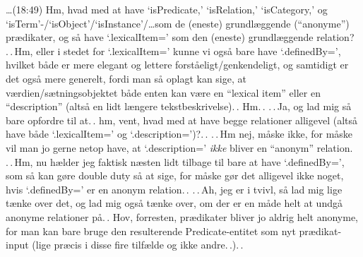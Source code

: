 \documentclass{report}
\begin{document}
\ldots (18:49) Hm, hvad med at have `isPredicate,' `isRelation,' `isCategory,' og `isTerm'-/`isObject'/`isInstance'/\ldots som de (eneste) grundlæggende (``anonyme'') prædikater, og så have `.lexicalItem=' som den (eneste) grundlæggende relation? .\,.\,Hm, eller i stedet for `.lexicalItem=' kunne vi også bare have `.definedBy=', hvilket både er mere elegant og lettere forståeligt/genkendeligt, og samtidigt er det også mere generelt, fordi man så oplagt kan sige, at værdien/sætningsobjektet både enten kan være en ``lexical item'' eller en ``description'' (altså en lidt længere tekstbeskrivelse).\,. Hm.\,. .\,.\,Ja, og lad mig så bare opfordre til at.\,. hm, vent, hvad med at have begge relationer alligevel (altså have både `.lexicalItem=' og `.description=')?.\,. .\,.\,Hm nej, måske ikke, for måske vil man jo gerne netop have, at `.description=' \emph{ikke} bliver en ``anonym'' relation. .\,.\,Hm, nu hælder jeg faktisk næsten lidt tilbage til bare at have `.definedBy=', som så kan gøre double duty så at sige, for måske gør det alligevel ikke noget, hvis `.definedBy=' er en anonym relation.\,. .\,.\,Ah, jeg er i tvivl, så lad mig lige tænke over det, og lad mig også tænke over, om der er en måde helt at undgå anonyme relationer på.\,. Hov, forresten, prædikater bliver jo aldrig helt anonyme, for man kan bare bruge den resulterende Predicate-entitet som nyt prædikat-input (lige præcis i disse fire tilfælde og ikke andre.\,.).\,. 
\end{document}
